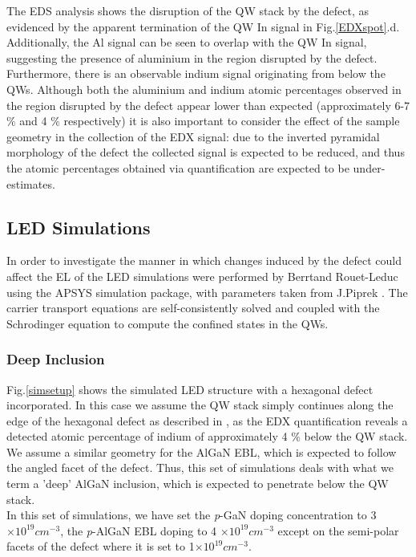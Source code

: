 \FloatBarrier 
The EDS analysis shows the disruption of the QW stack by the defect, as evidenced by the apparent termination of the QW In signal in Fig.\ref{EDXspot}.d. Additionally, the Al signal can be seen to overlap with the QW In signal, suggesting the presence of aluminium in the region disrupted by the defect. Furthermore, there is an observable indium signal originating from below the QWs. Although both the aluminium and indium atomic percentages observed in the region disrupted by the defect appear lower than expected (approximately 6-7 $\%$ and 4 $\%$ respectively) it is also important to consider the effect of the sample geometry in the collection of the EDX signal: due to the inverted pyramidal morphology of the defect the collected signal is expected to be reduced, and thus the atomic percentages obtained via quantification are expected to be under-estimates.

\subsection{LED Simulations}

In order to investigate the manner in which changes induced by the defect could affect the EL of the LED simulations were performed by Berrtand Rouet-Leduc using the APSYS simulation package, with parameters taken from J.Piprek \cite{Piprek2007}. The carrier transport equations are self-consistently solved and coupled with the Schrodinger equation to compute the confined states in the QWs.\\

\subsubsection{Deep Inclusion}
Fig.\ref{simsetup} shows the simulated LED structure with a hexagonal defect incorporated. In this case we assume the QW stack simply continues along the edge of the hexagonal defect as described in \cite{Hangleiter2005}, as the EDX quantification reveals a detected atomic percentage of indium of approximately 4 $\%$ below the QW stack. We assume a similar geometry for the AlGaN EBL, which is expected to follow the angled facet of the defect. Thus, this set of simulations deals with what we term a 'deep' AlGaN inclusion, which is expected to penetrate below the QW stack.\\
In this set of simulations, we have set the {\it p}-GaN doping concentration to 3 $\times 10^{19} cm^{-3}$, the {\it p}-AlGaN EBL doping to 4 $\times 10^{19} cm^{-3}$ except on the semi-polar facets of the defect where it is set to 1$\times 10^{19} cm^{-3}$.


